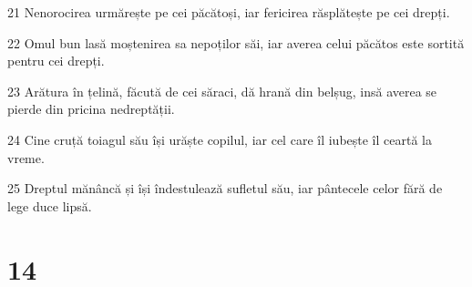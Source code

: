 \par 21 Nenorocirea urmărește pe cei păcătoși, iar fericirea răsplătește pe cei drepți.
\par 22 Omul bun lasă moștenirea sa nepoților săi, iar averea celui păcătos este sortită pentru cei drepți.
\par 23 Arătura în țelină, făcută de cei săraci, dă hrană din belșug, insă averea se pierde din pricina nedreptății.
\par 24 Cine cruță toiagul său își urăște copilul, iar cel care îl iubește îl ceartă la vreme.
\par 25 Dreptul mănâncă și își îndestulează sufletul său, iar pântecele celor fără de lege duce lipsă.

\chapter{14}

